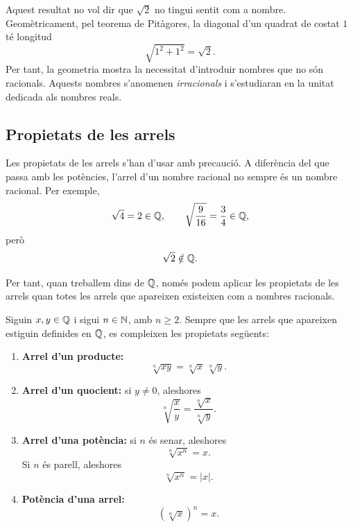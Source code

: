 Aquest resultat no vol dir que \(\sqrt{2}\) no tingui sentit com a nombre. Geomètricament, pel teorema de Pitàgores, la diagonal d'un quadrat de costat \(1\) té longitud
\[
	\sqrt{1^2+1^2}=\sqrt{2}.
\]
Per tant, la geometria mostra la necessitat d'introduir nombres que no són racionals. Aquests nombres s'anomenen \emph{irracionals} i s'estudiaran en la unitat dedicada als nombres reals.

\subsection{Propietats de les arrels}

Les propietats de les arrels s'han d'usar amb precaució. A diferència del que passa amb les potències, l'arrel d'un nombre racional no sempre és un nombre racional. Per exemple,
\[
	\sqrt{4}=2\in\mathbb{Q},
	\qquad
	\sqrt{\frac{9}{16}}=\frac{3}{4}\in\mathbb{Q},
\]
però
\[
	\sqrt{2}\notin\mathbb{Q}.
\]

Per tant, quan treballem dins de \(\mathbb{Q}\), només podem aplicar les propietats de les arrels quan totes les arrels que apareixen existeixen com a nombres racionals.

\begin{proposicio}
Siguin \(x,y\in\mathbb{Q}\) i sigui \(n\in\mathbb{N}\), amb \(n\geq2\). Sempre que les arrels que apareixen estiguin definides en \(\mathbb{Q}\), es compleixen les propietats següents:
\begin{enumerate}
	\item \textbf{Arrel d'un producte:}
	\[
		\sqrt[n]{xy}=\sqrt[n]{x}\,\sqrt[n]{y}.
	\]

	\item \textbf{Arrel d'un quocient:}
	si \(y\neq0\), aleshores
	\[
		\sqrt[n]{\frac{x}{y}}
		=
		\frac{\sqrt[n]{x}}{\sqrt[n]{y}}.
	\]

	\item \textbf{Arrel d'una potència:}
	si \(n\) és senar, aleshores
	\[
		\sqrt[n]{x^n}=x.
	\]
	Si \(n\) és parell, aleshores
	\[
		\sqrt[n]{x^n}=|x|.
	\]

	\item \textbf{Potència d'una arrel:}
	\[
		\left(\sqrt[n]{x}\right)^n=x.
	\]
\end{enumerate}
\end{proposicio}

